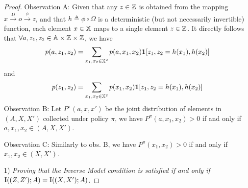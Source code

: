 \begin{proof}
Observation A: Given that any $z\in{\mathbb{Z}}$ is obtained from the mapping $x \overset{\Omega}{\rightarrow} o \overset{\phi}{\rightarrow} z$, and that $h \triangleq \phi \circ \Omega$ is a deterministic (but not necessarily invertible) function, each element $x\in{\mathbb{X}}$ maps to a single element $z\in{\mathbb{Z}}$. It directly follows that $\forall a,z_1,z_2 \in {\mathbb{A}}\times{\mathbb{Z}}\times {\mathbb{Z}}$, we have
\begin{equation*}
    p(a,z_1, z_2) = \sum_{x_1,x_2\in {\mathbb{X}}^2} p(a,x_1,x_2) \bm{1}[z_1,z_2=h(x_1),h(x_2)]
\end{equation*}
and
\begin{equation*}
    p(z_1, z_2) = \sum_{x_1,x_2\in {\mathbb{X}}^2} p(x_1,x_2) \bm{1}[z_1,z_2=h(x_1),h(x_2)]
\end{equation*}
Observation B: Let $P^{\pi}(a,x,x')$ be the joint distribution of elements in $(A,X,X')$ collected under policy $\pi$, we have $P^{\pi}(a,x_1,x_2)>0$ if and only if $a,x_1,x_2 \in (A,X,X')$.

Observation C: Similarly to obs. B, we have $P^{\pi}(x_1,x_2)>0$ if and only if $x_1,x_2 \in (X,X')$.


1) \textit{Proving that the Inverse Model condition is satisfied if and only if} $\text{I}((Z,Z');A)=\text{I}((X,X');A)$.


\end{proof}
